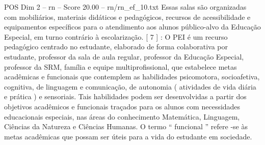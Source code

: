 \begin{textsample}{POS Dim 2 – rn – Score 20.00 – rn/rn\_ef\_10.txt}
Essas salas são organizadas com mobiliários, materiais didáticos e pedagógicos, recursos de acessibilidade e equipamentos específicos para o atendimento aos alunos público-alvo da Educação Especial, em turno contrário à escolarização. [ 7 ] : O PEI é um recurso pedagógico centrado no estudante, elaborado de forma colaborativa por estudante, professor da sala de aula regular, professor da Educação Especial, professor da SRM, família e equipe multiprofissional, que estabelece metas acadêmicas e funcionais que contemplem as habilidades psicomotora, socioafetiva, cognitiva, de linguagem e comunicação, de autonomia ( atividades de vida diária e prática ) e sensoriais.
Tais habilidades podem ser desenvolvidas a partir dos objetivos acadêmicos e funcionais traçados para os alunos com necessidades educacionais especiais, nas áreas do conhecimento Matemática, Linguagem, Ciências da Natureza e Ciências Humanas.
O termo “ funcional ” refere -se às metas acadêmicas que possam ser úteis para a vida do estudante em sociedade.

\end{textsample}
